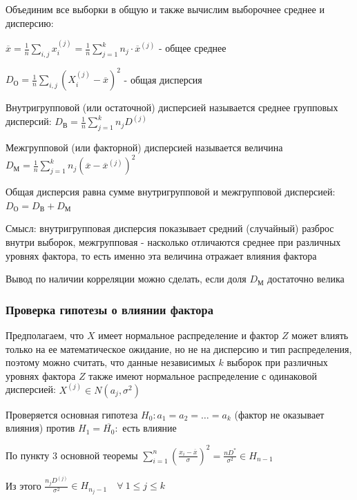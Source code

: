 \documentclass[12pt]{article}
\begin{document}
Объединим все выборки в общую и также вычислим выборочнее среднее и дисперсию: 

$\overline{x} = \frac{1}{n} \sum_{i, j} x^{(j)}_i = \frac{1}{n} \sum_{j = 1}^k n_j \cdot \overline{x}^{(j)}$ - общее среднее

$D_\text{О} = \frac{1}{n} \sum_{i, j} (X^{(j)}_i - \overline{x})^2$ - общая дисперсия

\Def Внутригрупповой (или остаточной) дисперсией называется среднее групповых дисперсий: $D_{\text{В}} = \frac{1}{n} \sum_{j = 1}^k n_j D^{(j)}$

\Def Межгрупповой (или факторной) дисперсией называется величина $D_{\text{М}} = \frac{1}{n} \sum_{j = 1}^k n_j (\overline{x} - \overline{x}^{(j)})^2$

\begin{MyTheorem}
     Общая дисперсия равна сумме внутригрупповой и межгрупповой дисперсией: $D_\text{О} = D_\text{В} + D_\text{М}$
\end{MyTheorem}

Смысл: внутригрупповая дисперсия показывает средний (случайный) разброс внутри выборок, межгрупповая - насколько отличаются среднее при различных 
уровнях фактора, то есть именно эта величина отражает влияния фактора

Вывод по наличии корреляции можно сделать, если доля $D_\text{М}$ достаточно велика

\hypertarget{factor_influence_hypothesis}{}

\subsubsection{Проверка гипотезы о влиянии фактора}

Предполагаем, что $X$ имеет нормальное распределение и фактор $Z$ может влиять только на ее математическое ожидание, 
но не на дисперсию и тип распределения, поэтому можно считать, что данные независимых $k$ выборок при различных уровнях фактора $Z$
также имеют нормальное распределение с одинаковой дисперсией: $X^{(j)} \in N(a_j, \sigma^2)$

Проверяется основная гипотеза $H_0 : a_1 = a_2 = \dots = a_k$ (фактор не оказывает влияния) против $H_1 = \overline{H_0} : $ есть влияние

По пункту 3 основной теоремы $\sum_{i = 1}^n \left(\frac{x_i - \overline{x}}{\sigma}\right)^2 = \frac{n D^*}{\sigma^2} \in H_{n - 1}$

Из этого $\frac{n_j D^{(j)}}{\sigma^2} \in H_{n_j - 1} \quad \forall \ 1 \leq j \leq k$
\end{document}
